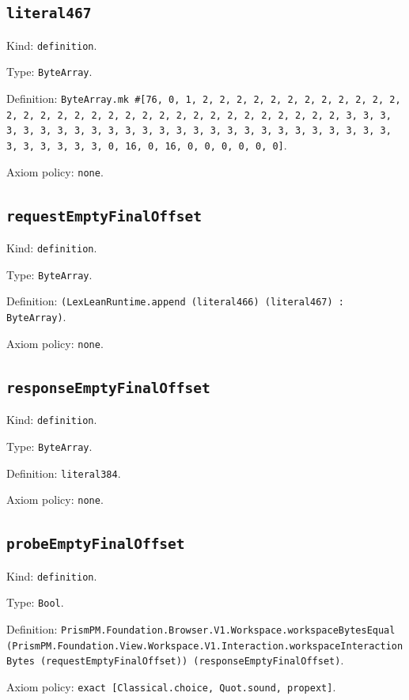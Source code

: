 \documentclass[11pt]{article}
\begin{document}
\subsection*{\texttt{literal467}}
\noindent Kind: \texttt{definition}.\par
\noindent Type: \texttt{ByteArray}.\par
\noindent Definition: \texttt{ByteArray.mk \#[76, 0, 1, 2, 2, 2, 2, 2, 2, 2, 2, 2, 2, 2, 2, 2, 2, 2, 2, 2, 2, 2, 2, 2, 2, 2, 2, 2, 2, 2, 2, 2, 2, 2, 2, 3, 3, 3, 3, 3, 3, 3, 3, 3, 3, 3, 3, 3, 3, 3, 3, 3, 3, 3, 3, 3, 3, 3, 3, 3, 3, 3, 3, 3, 3, 3, 3, 0, 16, 0, 16, 0, 0, 0, 0, 0, 0]}.\par
\noindent Axiom policy: \texttt{none}.\par
\subsection*{\texttt{requestEmptyFinalOffset}}
\noindent Kind: \texttt{definition}.\par
\noindent Type: \texttt{ByteArray}.\par
\noindent Definition: \texttt{(LexLeanRuntime.append (literal466) (literal467) : ByteArray)}.\par
\noindent Axiom policy: \texttt{none}.\par
\subsection*{\texttt{responseEmptyFinalOffset}}
\noindent Kind: \texttt{definition}.\par
\noindent Type: \texttt{ByteArray}.\par
\noindent Definition: \texttt{literal384}.\par
\noindent Axiom policy: \texttt{none}.\par
\subsection*{\texttt{probeEmptyFinalOffset}}
\noindent Kind: \texttt{definition}.\par
\noindent Type: \texttt{Bool}.\par
\noindent Definition: \texttt{PrismPM.Foundation.Browser.V1.Workspace.workspaceBytesEqual (PrismPM.Foundation.View.Workspace.V1.Interaction.workspaceInteractionBytes (requestEmptyFinalOffset)) (responseEmptyFinalOffset)}.\par
\noindent Axiom policy: \texttt{exact [Classical.choice, Quot.sound, propext]}.\par
\end{document}
